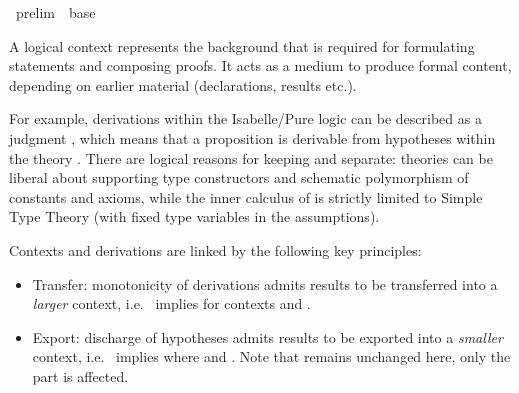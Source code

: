 %
\begin{isabellebody}%
\def\isabellecontext{prelim}%
%
\isadelimtheory
\isanewline
\isanewline
\isanewline
%
\endisadelimtheory
%
\isatagtheory
{}\isamarkupfalse%
\ prelim\ \ base\ %
\endisatagtheory
{\isafoldtheory}%
%
\isadelimtheory
%
\endisadelimtheory
%
\isamarkuptrue%
%
\isamarkuptrue%
%
\begin{isamarkuptext}%
A logical context represents the background that is required for
  formulating statements and composing proofs.  It acts as a medium to
  produce formal content, depending on earlier material (declarations,
  results etc.).

  For example, derivations within the Isabelle/Pure logic can be
  described as a judgment \isa{{\isasymGamma}\ {\isasymturnstile}\isactrlsub {\isasymTheta}\ {\isasymphi}}, which means that a
  proposition \isa{{\isasymphi}} is derivable from hypotheses \isa{{\isasymGamma}}
  within the theory \isa{{\isasymTheta}}.  There are logical reasons for
  keeping \isa{{\isasymTheta}} and \isa{{\isasymGamma}} separate: theories can be
  liberal about supporting type constructors and schematic
  polymorphism of constants and axioms, while the inner calculus of
  \isa{{\isasymGamma}\ {\isasymturnstile}\ {\isasymphi}} is strictly limited to Simple Type Theory (with
  fixed type variables in the assumptions).

  \medskip Contexts and derivations are linked by the following key
  principles:

  \begin{itemize}

  \item Transfer: monotonicity of derivations admits results to be
  transferred into a \emph{larger} context, i.e.\ \isa{{\isasymGamma}\ {\isasymturnstile}\isactrlsub {\isasymTheta}\ {\isasymphi}} implies \isa{{\isasymGamma}{\isacharprime}\ {\isasymturnstile}\isactrlsub {\isasymTheta}\isactrlsub {\isacharprime}\ {\isasymphi}} for contexts \isa{{\isasymTheta}{\isacharprime}\ {\isasymsupseteq}\ {\isasymTheta}} and \isa{{\isasymGamma}{\isacharprime}\ {\isasymsupseteq}\ {\isasymGamma}}.

  \item Export: discharge of hypotheses admits results to be exported
  into a \emph{smaller} context, i.e.\ \isa{{\isasymGamma}{\isacharprime}\ {\isasymturnstile}\isactrlsub {\isasymTheta}\ {\isasymphi}}
  implies \isa{{\isasymGamma}\ {\isasymturnstile}\isactrlsub {\isasymTheta}\ {\isasymDelta}\ {\isasymLongrightarrow}\ {\isasymphi}} where \isa{{\isasymGamma}{\isacharprime}\ {\isasymsupseteq}\ {\isasymGamma}} and
  \isa{{\isasymDelta}\ {\isacharequal}\ {\isasymGamma}{\isacharprime}\ {\isacharminus}\ {\isasymGamma}}.  Note that \isa{{\isasymTheta}} remains unchanged here,
  only the \isa{{\isasymGamma}} part is affected.


\end{itemize}
\end{isamarkuptext}
\end{isabellebody}
